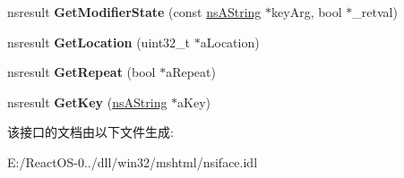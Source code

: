 \begin{DoxyCompactItemize}
nsresult {\bfseries Get\+Modifier\+State} (const \hyperlink{structns_string_container}{ns\+A\+String} $\ast$key\+Arg, bool $\ast$\+\_\+retval)
\item 
\mbox{\label{interfacens_i_d_o_m_key_event_afc4ac558c4c288be07f3090a8b6cad98}} 
nsresult {\bfseries Get\+Location} (uint32\+\_\+t $\ast$a\+Location)
\item 
\mbox{\label{interfacens_i_d_o_m_key_event_a283ebaef84d6d09a3c3cd3e0418ffa4e}} 
nsresult {\bfseries Get\+Repeat} (bool $\ast$a\+Repeat)
\item 
\mbox{\label{interfacens_i_d_o_m_key_event_a0b347be60d61b1283458d359de34ff35}} 
nsresult {\bfseries Get\+Key} (\hyperlink{structns_string_container}{ns\+A\+String} $\ast$a\+Key)
\end{DoxyCompactItemize}


该接口的文档由以下文件生成\+:\begin{DoxyCompactItemize}
\item 
E\+:/\+React\+O\+S-\/0../dll/win32/mshtml/nsiface.\+idl\end{DoxyCompactItemize}
